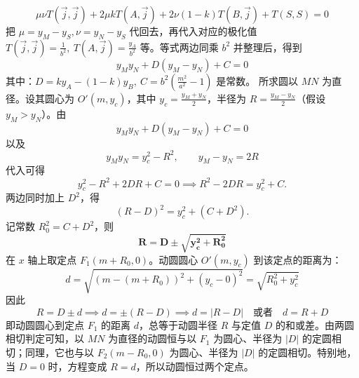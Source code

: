 \begin{solution}
$${ \mu \nu T(\vec{j},\vec{j}) + 2 \mu k T(A,\vec{j}) + 2 \nu (1-k) T(B,\vec{j}) + T(S,S) = 0 }$$
把 $\mu = y_M - y_S, \nu = y_N - y_S$ 代回去，再代入对应的极化值 $T(\vec{j},\vec{j}) = \frac{1}{b^2},~T(A,\vec{j}) = \frac{y_A}{b^2}$ 等。等式两边同乘 $b^2$ 并整理后，得到
$${ y_M y_N + D(y_M - y_N) + C = 0 }$$
其中：$D = k y_A - (1-k)y_B,~C = b^2 (\frac{m^2}{a^2} - 1)$ 是常数。
所求圆以 $MN$ 为直径。设其圆心为 $O'(m, y_c)$，其中 $y_c = \frac{y_M+y_N}{2}$，半径为 $R = \frac{y_M-y_N}{2}$（假设 $y_M > y_N$）。由
$$y_M y_N + D(y_M - y_N) + C = 0$$
以及
$$y_M y_N = y_c^2 - R^2,\qquad y_M - y_N = 2R$$
代入可得
$$y_c^2 - R^2 + 2DR + C = 0 \implies R^2 - 2DR = y_c^2 + C.$$
两边同时加上 $D^2$，得
$$(R - D)^2 = y_c^2 + (C + D^2).$$
记常数 $R_0^2 = C + D^2$，则
$$\mathbf{ R = D \pm \sqrt{y_c^2 + R_0^2} }$$
在 $x$ 轴上取定点 $F_1(m+R_0, 0)$。动圆圆心 $O'(m, y_c)$ 到该定点的距离为：
\[d = \sqrt{(m - (m+R_0))^2 + (y_c - 0)^2} = \sqrt{R_0^2 + y_c^2}\]
因此
$$R = D \pm d \implies d = \pm (R - D) \implies d = |R - D| \quad \text{或者} \quad d = R + D$$
即动圆圆心到定点 $F_1$ 的距离 $d$，总等于动圆半径 $R$ 与定值 $D$ 的和或差。由两圆相切判定可知，以 $MN$ 为直径的动圆恒与以 $F_1$ 为圆心、半径为 $|D|$ 的定圆相切；同理，它也与以 $F_2(m-R_0, 0)$ 为圆心、半径为 $|D|$ 的定圆相切。特别地，当 $D = 0$ 时，方程变成 $R = d$，所以动圆恒过两个定点。
\end{solution}

